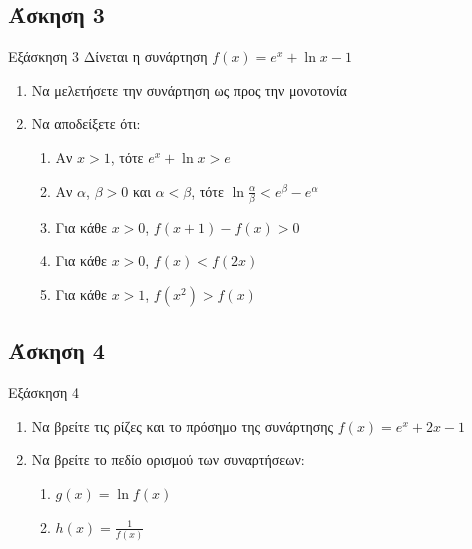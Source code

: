 \documentclass[greek]{beamer}
\begin{document}
\subsection{Άσκηση 3}
\begin{frame}[label=Άσκηση3,t]{Εξάσκηση 3}
      Δίνεται η συνάρτηση $f(x)=e^x+\ln x-1$
      \begin{enumerate}
            \item Να μελετήσετε την συνάρτηση ως προς την μονοτονία \pause
            \item Να αποδείξετε ότι:
                  \begin{enumerate}
                        \item Αν $x>1$, τότε $e^x+\ln x>e$ \pause
                        \item Αν $α$, $β>0$ και $α<β$, τότε $\ln \frac{α}{β}<e^β-e^α$ \pause
                        \item Για κάθε $x>0$, $f(x+1)-f(x)>0$ \pause
                        \item Για κάθε $x>0$, $f(x)<f(2x)$ \pause
                        \item Για κάθε $x>1$, $f(x^2)>f(x)$
                  \end{enumerate}
      \end{enumerate}
\end{frame}

\subsection{Άσκηση 4}
\begin{frame}[label=Άσκηση4,t]{Εξάσκηση 4}
      \begin{enumerate}
            \item Να βρείτε τις ρίζες και το πρόσημο της συνάρτησης $f(x)=e^x+2x-1$ \pause
            \item Να βρείτε το πεδίο ορισμού των συναρτήσεων:
                  \begin{enumerate}
                        \item $g(x)=\ln f(x)$ \pause
                        \item $h(x)=\frac{1}{f(x)}$
                  \end{enumerate}
      \end{enumerate}
\end{frame}
\end{document}
